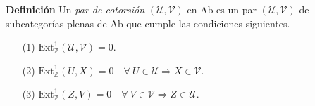 \documentclass[preview]{standalone}
\begin{document}
\begin{center}
\justifying \textbf{Definición} Un \emph{par de cotorsión} $(\mathcal{U}, \mathcal{V})$ en Ab es un par $(\mathcal{U}, \mathcal{V})$ de subcategorías plenas de Ab que cumple las condiciones siguientes.\begin{enumerate} \item[(1)] $\text{Ext}^1_\mathbb{Z} (\mathcal{U}, \mathcal{V}) = 0$. \item[(2)] $\text{Ext}^1_\mathbb{Z} (U, X) = 0 \quad \forall \ U\in\mathcal{U} \Rightarrow X\in\mathcal{V}$. \item[(3)] $\text{Ext}^1_\mathbb{Z} (Z, V) = 0 \quad \forall \ V\in\mathcal{V} \Rightarrow Z\in\mathcal{U}$. \end{enumerate}
\end{center}
\end{document}
